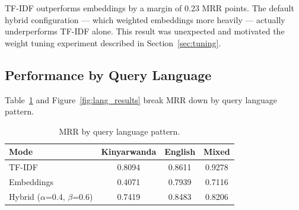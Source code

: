 \documentclass[11pt,a4paper]{article}
\begin{document}
TF-IDF outperforms embeddings by a margin of 0.23 MRR points. The default
hybrid configuration — which weighted embeddings more heavily — actually
underperforms TF-IDF alone. This result was unexpected and motivated the
weight tuning experiment described in Section~\ref{sec:tuning}.

\subsection{Performance by Query Language}

Table~\ref{tab:bylang} and Figure~\ref{fig:lang_results} break MRR down
by query language pattern.

\begin{table}[H]
\centering
\caption{MRR by query language pattern.}
\label{tab:bylang}
\begin{tabular}{lccc}
\toprule
\textbf{Mode} & \textbf{Kinyarwanda} & \textbf{English} & \textbf{Mixed} \\
\midrule
TF-IDF     & 0.8094 & 0.8611 & 0.9278 \\
Embeddings & 0.4071 & 0.7939 & 0.7116 \\
Hybrid ($\alpha$=0.4, $\beta$=0.6) & 0.7419 & 0.8483 & 0.8206 \\
\bottomrule
\end{tabular}
\end{table}
\end{document}
